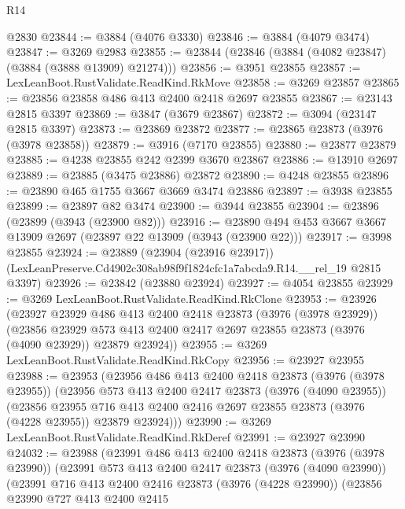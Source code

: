 \begin{lexlean}{R14}
\begin{coremodule}
    @2830
@23844 := @3884 (@4076 @3330)
@23846 := @3884 (@4079 @3474)
@23847 := @3269 @2983
@23855 := @23844 (@23846 (@3884 (@4082 @23847) (@3884 (@3888 @13909) @21274)))
@23856 := @3951 @23855
@23857 := LexLeanBoot.RustValidate.ReadKind.RkMove
@23858 := @3269 @23857
@23865 := @23856 @23858 @486 @413 @2400 @2418 @2697 @23855
@23867 := @23143 @2815 @3397
@23869 := @3847 (@3679 @23867)
@23872 := @3094 (@23147 @2815 @3397)
@23873 := @23869 @23872
@23877 := @23865 @23873 (@3976 (@3978 @23858))
@23879 := @3916 (@7170 @23855)
@23880 := @23877 @23879
@23885 := @4238 @23855 @242 @2399 @3670 @23867
@23886 := @13910 @2697
@23889 := @23885 (@3475 @23886) @23872
@23890 := @4248 @23855
@23896 := @23890 @465 @1755 @3667 @3669 @3474 @23886
@23897 := @3938 @23855
@23899 := @23897 @82 @3474
@23900 := @3944 @23855
@23904 := @23896 (@23899 (@3943 (@23900 @82)))
@23916 := @23890 @494 @453 @3667 @3667 @13909 @2697 (@23897 @22 @13909 (@3943 (@23900 @22)))
@23917 := @3998 @23855
@23924 := @23889
    (@23904 (@23916 @23917))
    (LexLeanPreserve.Cd4902c308ab98f9f1824cfc1a7abcda9.R14.__rel_19 @2815 @3397)
@23926 := @23842 (@23880 @23924)
@23927 := @4054 @23855
@23929 := @3269 LexLeanBoot.RustValidate.ReadKind.RkClone
@23953 := @23926
    (@23927
      @23929
      @486
      @413
      @2400
      @2418
      @23873
      (@3976 (@3978 @23929))
      (@23856
        @23929
        @573
        @413
        @2400
        @2417
        @2697
        @23855
        @23873
        (@3976 (@4090 @23929))
        @23879
        @23924))
@23955 := @3269 LexLeanBoot.RustValidate.ReadKind.RkCopy
@23956 := @23927 @23955
@23988 := @23953
    (@23956
      @486
      @413
      @2400
      @2418
      @23873
      (@3976 (@3978 @23955))
      (@23956
        @573
        @413
        @2400
        @2417
        @23873
        (@3976 (@4090 @23955))
        (@23856
          @23955
          @716
          @413
          @2400
          @2416
          @2697
          @23855
          @23873
          (@3976 (@4228 @23955))
          @23879
          @23924)))
@23990 := @3269 LexLeanBoot.RustValidate.ReadKind.RkDeref
@23991 := @23927 @23990
@24032 := @23988
    (@23991
      @486
      @413
      @2400
      @2418
      @23873
      (@3976 (@3978 @23990))
      (@23991
        @573
        @413
        @2400
        @2417
        @23873
        (@3976 (@4090 @23990))
        (@23991
          @716
          @413
          @2400
          @2416
          @23873
          (@3976 (@4228 @23990))
          (@23856
            @23990
            @727
            @413
            @2400
            @2415

\end{coremodule}
\end{lexlean}
